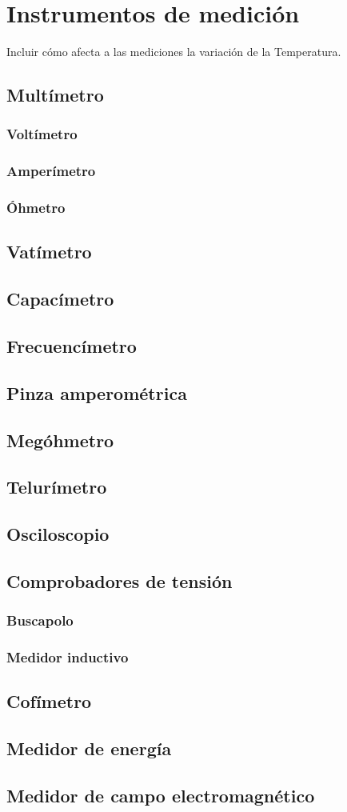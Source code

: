 \chapter{Instrumentos de medición}

Incluir cómo afecta a las mediciones la variación de la Temperatura.
\section{Multímetro}
\subsection{Voltímetro}
\subsection{Amperímetro}
\subsection{Óhmetro}
\section{Vatímetro}
\section{Capacímetro}
\section{Frecuencímetro}
\section{Pinza amperométrica}
\section{Megóhmetro}
\section{Telurímetro}
\section{Osciloscopio}
\section{Comprobadores de tensión}
\subsection{Buscapolo}
\subsection{Medidor inductivo}
\section{Cofímetro}
\section{Medidor de energía}
\section{Medidor de campo electromagnético}